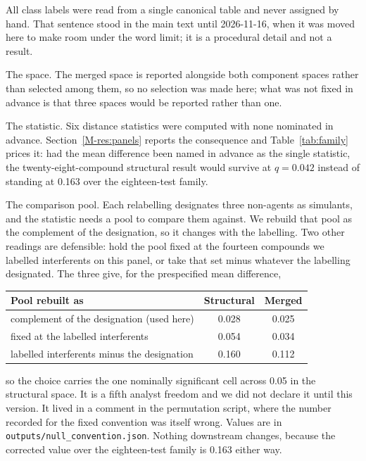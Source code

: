 \documentclass[11pt,a4paper]{article}
\begin{document}
All class labels were read from a single canonical table and never assigned by hand. That sentence stood in the main text until 2026-11-16, when it was moved here to make room under the word limit; it is a procedural detail and not a result.

The space. The merged space is reported alongside both component spaces rather
than selected among them, so no selection was made here; what was not fixed in
advance is that three spaces would be reported rather than one.

The statistic. Six distance statistics were computed with none nominated in
advance. Section~\ref{M-res:panels} reports the consequence and
Table~\ref{tab:family} prices it: had the mean difference been named in advance
as the single statistic, the twenty-eight-compound structural result would
survive at $q = 0.042$ instead of standing at 0.163 over the eighteen-test
family.

The comparison pool. Each relabelling designates three non-agents as simulants,
and the statistic needs a pool to compare them against. We rebuild that pool as
the complement of the designation, so it changes with the labelling. Two other
readings are defensible: hold the pool fixed at the fourteen compounds we
labelled interferents on this panel, or take that set minus whatever the labelling designated.
The three give, for the prespecified mean difference,

\begin{center}
\begin{tabular}{lcc}
\toprule
Pool rebuilt as & Structural & Merged \\
\midrule
complement of the designation (used here) & 0.028 & 0.025 \\
fixed at the labelled interferents        & 0.054 & 0.034 \\
labelled interferents minus the designation & 0.160 & 0.112 \\
\bottomrule
\end{tabular}
\end{center}

\noindent so the choice carries the one nominally significant cell across 0.05
in the structural space. It is a fifth analyst freedom and we did not declare it
until this version. It lived in a comment in the permutation script, where the
number recorded for the fixed convention was itself wrong. Values are in
\texttt{outputs/\allowbreak null\_\allowbreak convention.json}. Nothing downstream changes, because the
corrected value over the eighteen-test family is 0.163 either way.
\end{document}
